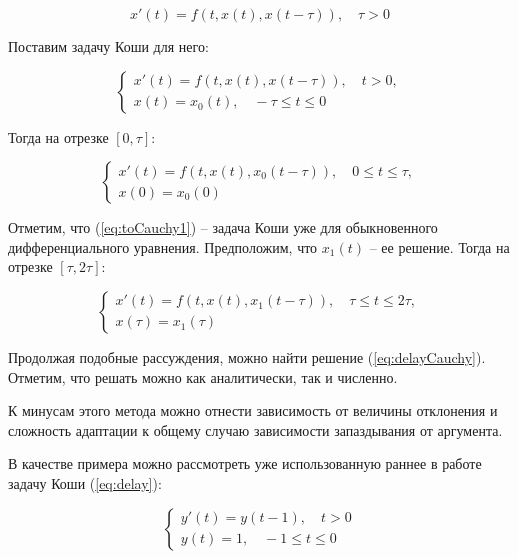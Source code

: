 \begin{equation}
x'(t) = f(t,x(t),x(t-\tau)), \quad \tau>0
\end{equation}

Поставим задачу Коши для него:

\begin{equation}\label{eq:delayCauchy}
\left\{
\begin{aligned}
x'(t) = f(t,x(t),x(t-\tau)), \quad t>0,\\
x(t) = x_0(t), \quad -\tau \leq t \leq 0
\end{aligned}
\right.
\end{equation}

Тогда на отрезке $[0,\tau]$:

\begin{equation}\label{eq:toCauchy1}
\left\{
\begin{aligned}
x'(t) = f(t,x(t),x_0(t-\tau)), \quad 0 \leq t \leq \tau,\\
x(0) = x_0(0)
\end{aligned}
\right.
\end{equation}

Отметим, что (\ref{eq:toCauchy1}) \--- задача Коши уже для обыкновенного дифференциального уравнения. Предположим, что $x_1(t)$ \--- ее решение. Тогда на отрезке $[\tau,2\tau]$:

\begin{equation}\label{eq:toCauchy2}
\left\{
\begin{aligned}
x'(t) = f(t,x(t),x_1(t-\tau)), \quad \tau \leq t \leq 2\tau,\\
x(\tau) = x_1(\tau)
\end{aligned}
\right.
\end{equation}

Продолжая подобные рассуждения, можно найти решение (\ref{eq:delayCauchy}). Отметим, что решать можно как аналитически, так и численно.

К минусам этого метода можно отнести зависимость от величины отклонения и сложность адаптации к общему случаю зависимости запаздывания от аргумента.

В качестве примера можно рассмотреть уже использованную раннее в работе задачу Коши (\ref{eq:delay}):

\begin{equation*}
\left\{
\begin{aligned}
y'(t) = y(t-1), \quad t>0\\
y(t) = 1, \quad -1 \leq t \leq 0
\end{aligned}
\right.
\end{equation*}

